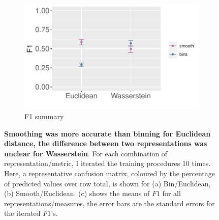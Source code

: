 \begin{figure}[htbp]
    \begin{subfigure}{\textwidth}
    \centering
    \includegraphics[scale=0.8]{graphics/f1_gle.pdf}
    \caption{F1 summary}
    \label{fig:f1_gle}
    \end{subfigure}
    
    
    \caption{\textbf{Smoothing was more accurate than binning for Euclidean distance, the difference between two representations was unclear for Wasserstein}. For each combination of representation/metric, I iterated the training procedures 10 times. Here, a representative confusion matrix, coloured by the percentage of predicted values over row total, is shown for (a) Bin/Euclidean, (b) Smooth/Euclidean. (c) shows the means of $F1$ for all representations/measures, the error bars are the standard errors for the iterated $F1$'s.}
    \label{fig:ml_gle}
\end{figure}